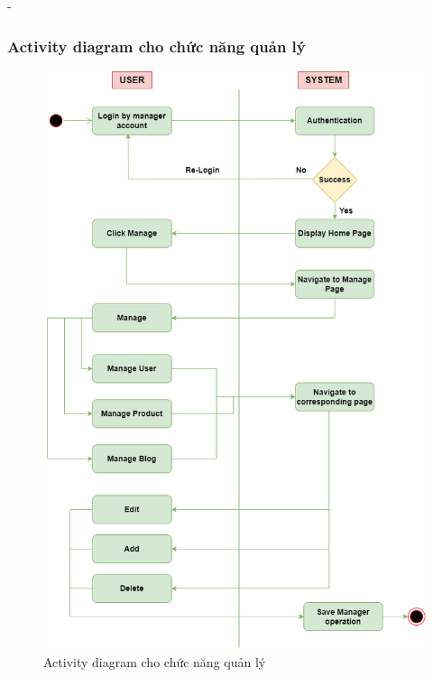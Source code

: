 \begin {list} {-}{}
\subsubsection{Activity diagram cho chức năng quản lý}
\begin{figure}[h]
    \centering
    \includegraphics[scale=0.5]{images/hieu/chap-3/manage-activity-diagram.png}
    \caption{Activity diagram cho chức năng quản lý}
\end{figure}
\newpage

\end{list}
